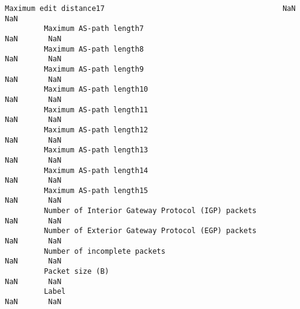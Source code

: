 \documentclass[11pt]{article}
\begin{document}
\begin{Verbatim}[commandchars=\\\{\}]
         Maximum edit distance17                                         NaN       NaN   
         Maximum AS-path length7                                         NaN       NaN   
         Maximum AS-path length8                                         NaN       NaN   
         Maximum AS-path length9                                         NaN       NaN   
         Maximum AS-path length10                                        NaN       NaN   
         Maximum AS-path length11                                        NaN       NaN   
         Maximum AS-path length12                                        NaN       NaN   
         Maximum AS-path length13                                        NaN       NaN   
         Maximum AS-path length14                                        NaN       NaN   
         Maximum AS-path length15                                        NaN       NaN   
         Number of Interior Gateway Protocol (IGP) packets               NaN       NaN   
         Number of Exterior Gateway Protocol (EGP) packets               NaN       NaN   
         Number of incomplete packets                                    NaN       NaN   
         Packet size (B)                                                 NaN       NaN   
         Label                                                           NaN       NaN   
         

\end{Verbatim}
\end{document}
